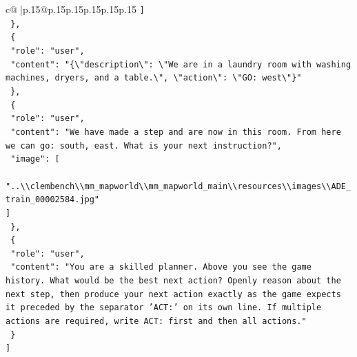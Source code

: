 \documentclass{article}
\begin{document}
{\begin{supertabular}{c@{$\;$}|p{.15\linewidth}@{}p{.15\linewidth}p{.15\linewidth}p{.15\linewidth}p{.15\linewidth}p{.15\linewidth}}
{{{\texttt{    {]}} \\
\texttt{  \},} \\
\texttt{  \{} \\
\texttt{    "role": "user",} \\
\texttt{    "content": "\{\textbackslash{}"description\textbackslash{}": \textbackslash{}"We are in a laundry room with washing machines, dryers, and a table.\textbackslash{}", \textbackslash{}"action\textbackslash{}": \textbackslash{}"GO: west\textbackslash{}"\}"} \\
\texttt{  \},} \\
\texttt{  \{} \\
\texttt{    "role": "user",} \\
\texttt{    "content": "We have made a step and are now in this room. From here we can go: south, east. What is your next instruction?",} \\
\texttt{    "image": {[}} \\
\texttt{      "..\textbackslash{}\textbackslash{}clembench\textbackslash{}\textbackslash{}mm\_mapworld\textbackslash{}\textbackslash{}mm\_mapworld\_main\textbackslash{}\textbackslash{}resources\textbackslash{}\textbackslash{}images\textbackslash{}\textbackslash{}ADE\_train\_00002584.jpg"} \\
\texttt{    {]}} \\
\texttt{  \},} \\
\texttt{  \{} \\
\texttt{    "role": "user",} \\
\texttt{    "content": "You are a skilled planner. Above you see the game history. What would be the best next action? Openly reason about the next step, then produce your next action exactly as the game expects it preceded by the separator 'ACT:' on its own line. If multiple actions are required, write ACT: first and then all actions."} \\
\texttt{  \}} \\
\texttt{{]}} \\
            }
        }
    }
     \\ \\


\end{supertabular}}
\end{document}
